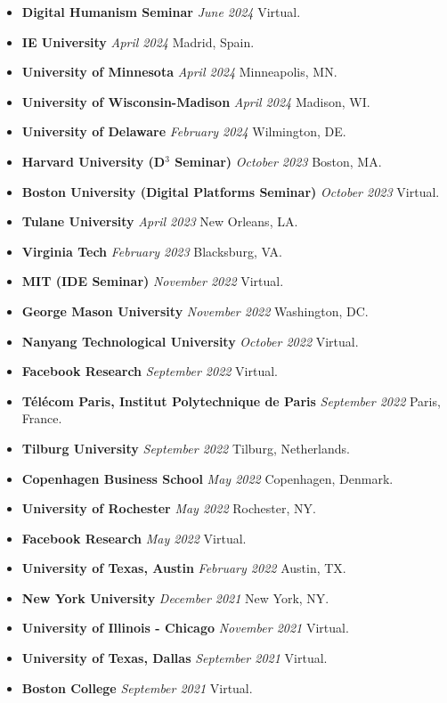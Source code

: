 \documentclass[10.5pt,letterpaper,sans]{moderncv}        %
\begin{document}
\begin{itemize}
\item \textbf{Digital Humanism Seminar} \textit{June 2024} Virtual.
\item \textbf{IE University} \textit{April 2024} Madrid, Spain.
\item \textbf{University of Minnesota} \textit{April 2024} Minneapolis, MN.
\item \textbf{University of Wisconsin-Madison} \textit{April 2024} Madison, WI.
\item \textbf{University of Delaware} \textit{February 2024} Wilmington, DE.
\item \textbf{Harvard University (D$^3$ Seminar)} \textit{October 2023} Boston, MA.
\item \textbf{Boston University (Digital Platforms Seminar)} \textit{October 2023} Virtual.
\item \textbf{Tulane University} \textit{April 2023} New Orleans, LA.
\item \textbf{Virginia Tech} \textit{February 2023} Blacksburg, VA.
\item \textbf{MIT (IDE Seminar)} \textit{November 2022} Virtual.
\item \textbf{George Mason University} \textit{November 2022} Washington, DC.
\item \textbf{Nanyang Technological University} \textit{October 2022} Virtual.
\item \textbf{Facebook Research} \textit{September 2022} Virtual.
\item \textbf{T\'el\'ecom Paris, Institut Polytechnique de Paris} \textit{September 2022} Paris, France.
\item \textbf{Tilburg University} \textit{September 2022} Tilburg, Netherlands.
\item \textbf{Copenhagen Business School} \textit{May 2022} Copenhagen, Denmark.
\item \textbf{University of Rochester} \textit{May 2022} Rochester, NY.
\item \textbf{Facebook Research} \textit{May 2022} Virtual.
\item \textbf{University of Texas, Austin} \textit{February 2022} Austin, TX.
\item \textbf{New York University} \textit{December 2021} New York, NY.
\item \textbf{University of Illinois - Chicago} \textit{November 2021} Virtual.
\item \textbf{University of Texas, Dallas} \textit{September 2021} Virtual.
\item \textbf{Boston College} \textit{September 2021} Virtual.

\end{itemize}
\end{document}
